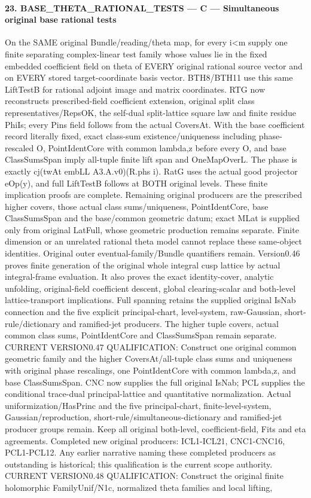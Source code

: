 \documentclass[11pt,a4paper]{article}
\numberwithin{equation}{section}
\theoremstyle{remark}\newtheorem{remark}[theorem]{Remark}
\begin{document}
\paragraph{23. BASE\_\allowbreak THETA\_\allowbreak RATIONAL\_\allowbreak TESTS — C — Simultaneous original base rational tests}

On the SAME original Bundle/reading/theta map, for every i<m supply one finite separating complex-linear test family whose values lie in the fixed embedded coefficient field on theta of EVERY original rational source vector and on EVERY stored target-coordinate basis vector. BTH8/BTH11 use this same LiftTestB for rational adjoint image and matrix coordinates. RTG now reconstructs prescribed-field coefficient extension, original split class representatives/RepsOK, the self-dual split-lattice square law and finite residue PhiIs; every Pins field follows from the actual CoversAt. With the base coefficient record literally fixed, exact class-sum existence/uniqueness including phase-rescaled O, PointIdentCore with common lambda,z before every O, and base ClassSumsSpan imply all-tuple finite lift span and OneMapOverL. The phase is exactly cj(twAt embLL A3.A.v0)(R.phs i). RatG uses the actual good projector eOp(y), and full LiftTestB follows at BOTH original levels. These finite implication proofs are complete. Remaining original producers are the prescribed higher covers, those actual class sums/uniqueness, PointIdentCore, base ClassSumsSpan and the base/common geometric datum; exact MLat is supplied only from original LatFull, whose geometric production remains separate. Finite dimension or an unrelated rational theta model cannot replace these same-object identities. Original outer eventual-family/Bundle quantifiers remain. Version0.46 proves finite generation of the original whole integral cusp lattice by actual integral-frame evaluation. It also proves the exact identity-cover, analytic unfolding, original-field coefficient descent, global clearing-scalar and both-level lattice-transport implications. Full spanning retains the supplied original IsNab connection and the five explicit principal-chart, level-system, raw-Gaussian, short-rule/dictionary and ramified-jet producers. The higher tuple covers, actual common class sums, PointIdentCore and ClassSumsSpan remain separate. CURRENT VERSION0.47 QUALIFICATION: Construct one original common geometric family and the higher CoversAt/all-tuple class sums and uniqueness with original phase rescalings, one PointIdentCore with common lambda,z, and base ClassSumsSpan. CNC now supplies the full original IsNab; PCL supplies the conditional trace-dual principal-lattice and quantitative normalization. Actual uniformization/HasPrinc and the five principal-chart, finite-level-system, Gaussian/reproduction, short-rule/simultaneous-dictionary and ramified-jet producer groups remain. Keep all original both-level, coefficient-field, Fits and eta agreements. Completed new original producers: ICL1-ICL21, CNC1-CNC16, PCL1-PCL12. Any earlier narrative naming these completed producers as outstanding is historical; this qualification is the current scope authority. CURRENT VERSION0.48 QUALIFICATION: Construct the original finite holomorphic FamilyUnif/N1c, normalized theta families and local lifting, 
\end{document}
